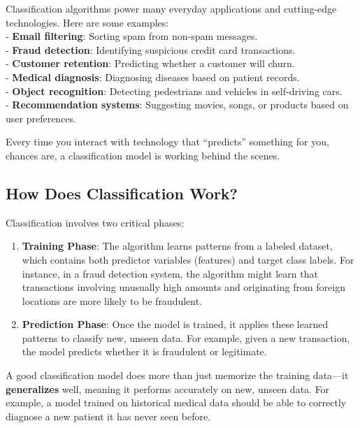 \documentclass[
]{book}
\providecommand{\tightlist}{%
  \setlength{\itemsep}{0pt}\setlength{\parskip}{0pt}}
\theoremstyle{definition}
\theoremstyle{definition}
\theoremstyle{definition}
\theoremstyle{definition}
\theoremstyle{remark}
\begin{document}
Classification algorithms power many everyday applications and cutting-edge technologies. Here are some examples:\\
- \textbf{Email filtering}: Sorting spam from non-spam messages.\\
- \textbf{Fraud detection}: Identifying suspicious credit card transactions.\\
- \textbf{Customer retention}: Predicting whether a customer will churn.\\
- \textbf{Medical diagnosis}: Diagnosing diseases based on patient records.\\
- \textbf{Object recognition}: Detecting pedestrians and vehicles in self-driving cars.\\
- \textbf{Recommendation systems}: Suggesting movies, songs, or products based on user preferences.

Every time you interact with technology that ``predicts'' something for you, chances are, a classification model is working behind the scenes.

\subsection*{How Does Classification Work?}\label{how-does-classification-work}

Classification involves two critical phases:

\begin{enumerate}
\def\labelenumi{\arabic{enumi}.}
\tightlist
\item
  \textbf{Training Phase}: The algorithm learns patterns from a labeled dataset, which contains both predictor variables (features) and target class labels. For instance, in a fraud detection system, the algorithm might learn that transactions involving unusually high amounts and originating from foreign locations are more likely to be fraudulent.\\
\item
  \textbf{Prediction Phase}: Once the model is trained, it applies these learned patterns to classify new, unseen data. For example, given a new transaction, the model predicts whether it is fraudulent or legitimate.
\end{enumerate}

A good classification model does more than just memorize the training data---it \textbf{generalizes} well, meaning it performs accurately on new, unseen data. For example, a model trained on historical medical data should be able to correctly diagnose a new patient it has never seen before.
\end{document}
